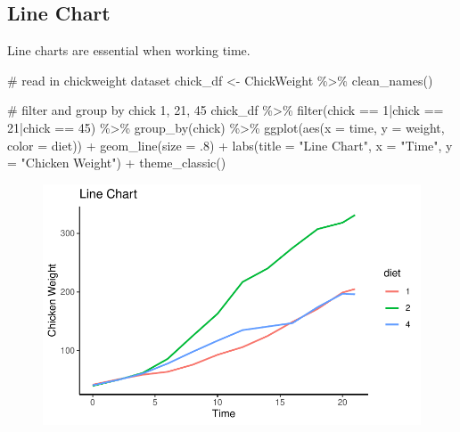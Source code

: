\documentclass[
  letterpaper,
  DIV=11,
  numbers=noendperiod]{scrreprt}
\newenvironment{Shaded}{\begin{snugshade}}{\end{snugshade}}
\newcommand{\AttributeTok}[1]{\textcolor[rgb]{0.40,0.45,0.13}{#1}}
\newcommand{\CommentTok}[1]{\textcolor[rgb]{0.37,0.37,0.37}{#1}}
\newcommand{\DecValTok}[1]{\textcolor[rgb]{0.68,0.00,0.00}{#1}}
\newcommand{\FunctionTok}[1]{\textcolor[rgb]{0.28,0.35,0.67}{#1}}
\newcommand{\NormalTok}[1]{\textcolor[rgb]{0.00,0.23,0.31}{#1}}
\newcommand{\OtherTok}[1]{\textcolor[rgb]{0.00,0.23,0.31}{#1}}
\newcommand{\SpecialCharTok}[1]{\textcolor[rgb]{0.37,0.37,0.37}{#1}}
\newcommand{\StringTok}[1]{\textcolor[rgb]{0.13,0.47,0.30}{#1}}
\begin{document}
\hypertarget{line-chart}{%
\subsection{Line Chart}\label{line-chart}}

Line charts are essential when working time.

\begin{Shaded}
\begin{Highlighting}[]
\CommentTok{\# read in chickweight dataset}
\NormalTok{chick\_df }\OtherTok{\textless{}{-}}\NormalTok{ ChickWeight }\SpecialCharTok{\%\textgreater{}\%}
  \FunctionTok{clean\_names}\NormalTok{()}

\CommentTok{\# filter and group by chick 1, 21, 45}
\NormalTok{chick\_df }\SpecialCharTok{\%\textgreater{}\%}
  \FunctionTok{filter}\NormalTok{(chick }\SpecialCharTok{==} \DecValTok{1}\SpecialCharTok{|}\NormalTok{chick }\SpecialCharTok{==} \DecValTok{21}\SpecialCharTok{|}\NormalTok{chick }\SpecialCharTok{==} \DecValTok{45}\NormalTok{) }\SpecialCharTok{\%\textgreater{}\%}
  \FunctionTok{group\_by}\NormalTok{(chick) }\SpecialCharTok{\%\textgreater{}\%}
  \FunctionTok{ggplot}\NormalTok{(}\FunctionTok{aes}\NormalTok{(}\AttributeTok{x =}\NormalTok{ time, }\AttributeTok{y =}\NormalTok{ weight, }\AttributeTok{color =}\NormalTok{ diet)) }\SpecialCharTok{+} 
  \FunctionTok{geom\_line}\NormalTok{(}\AttributeTok{size =}\NormalTok{ .}\DecValTok{8}\NormalTok{) }\SpecialCharTok{+}
  \FunctionTok{labs}\NormalTok{(}\AttributeTok{title =} \StringTok{"Line Chart"}\NormalTok{, }\AttributeTok{x =} \StringTok{"Time"}\NormalTok{, }\AttributeTok{y =} \StringTok{"Chicken Weight"}\NormalTok{) }\SpecialCharTok{+}
  \FunctionTok{theme\_classic}\NormalTok{()}
\end{Highlighting}
\end{Shaded}

\begin{figure}[H]

{\centering \includegraphics{./visualizing-data_files/figure-pdf/unnamed-chunk-10-1.pdf}

}

\end{figure}
\end{document}
